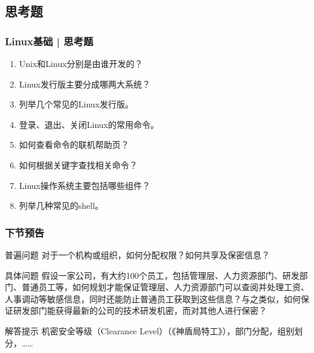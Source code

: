 \subsection{思考题}
\begin{frame}
  \frametitle{Linux基础 | 思考题}
  \begin{enumerate}
    \item Unix和Linux分别是由谁开发的？
    \item Linux发行版主要分成哪两大系统？
    \item 列举几个常见的Linux发行版。
    \item 登录、退出、关闭Linux的常用命令。
    \item 如何查看命令的联机帮助页？
    \item 如何根据关键字查找相关命令？
    \item Linux操作系统主要包括哪些组件？
    \item 列举几种常见的shell。
  \end{enumerate}
\end{frame}

\begin{frame}
  \frametitle{下节预告}
  \begin{block}{普遍问题}
    对于一个机构或组织，如何分配权限？如何共享及保密信息？
  \end{block}
  \pause
  \begin{block}{具体问题}
    假设一家公司，有大约100个员工，包括管理层、人力资源部门、研发部门、普通员工等，如何规划才能保证管理层、人力资源部门可以查阅并处理工资、人事调动等敏感信息，同时还能防止普通员工获取到这些信息？与之类似，如何保证研发部门能获得最新的公司的技术研发机密，而对其他人进行保密？
  \end{block}
  \pause
  \begin{block}{解答提示}
    机密安全等级（Clearance Level）（《神盾局特工》），部门分配，组别划分，……
  \end{block}
\end{frame}



